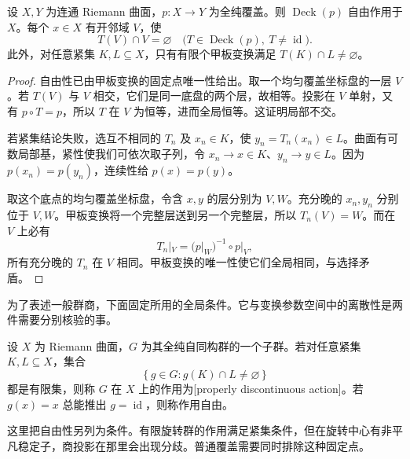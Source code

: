 \begin{proposition}[甲板作用的局部离散性]\label{b3:prop:11-deck-proper}
设 \(X,Y\) 为连通 Riemann 曲面，\(p:X\rightarrow Y\) 为全纯覆盖。则 \(\operatorname{Deck}(p)\) 自由作用于 \(X\)。每个 \(x\in X\) 有开邻域 \(V\)，使
\[
 T(V)\cap V=\varnothing\quad
 \bigl(T\in\operatorname{Deck}(p),\ T\ne\operatorname{id}\bigr).
\]
此外，对任意紧集 \(K,L\subseteq X\)，只有有限个甲板变换满足 \(T(K)\cap L\ne\varnothing\)。
\end{proposition}
\begin{proof}
自由性已由甲板变换的固定点唯一性给出。取一个均匀覆盖坐标盘的一层 \(V\)。若 \(T(V)\) 与 \(V\) 相交，它们是同一底盘的两个层，故相等。投影在 \(V\) 单射，又有 \(p\circ T=p\)，所以 \(T\) 在 \(V\) 为恒等，进而全局恒等。这证明局部不交。

若紧集结论失败，选互不相同的 \(T_n\) 及 \(x_n\in K\)，使 \(y_n=T_n(x_n)\in L\)。曲面有可数局部基，紧性使我们可依次取子列，令 \(x_n\rightarrow x\in K\)、\(y_n\rightarrow y\in L\)。因为 \(p(x_n)=p(y_n)\)，连续性给 \(p(x)=p(y)\)。

取这个底点的均匀覆盖坐标盘，令含 \(x,y\) 的层分别为 \(V,W\)。充分晚的 \(x_n,y_n\) 分别位于 \(V,W\)。甲板变换将一个完整层送到另一个完整层，所以 \(T_n(V)=W\)。而在 \(V\) 上必有
\[
 T_n|_V=(p|_W)^{-1}\circ p|_V,
\]
所有充分晚的 \(T_n\) 在 \(V\) 相同。甲板变换的唯一性使它们全局相同，与选择矛盾。
\end{proof}

为了表述一般群商，下面固定所用的全局条件。它与变换参数空间中的离散性是两件需要分别核验的事。

\begin{definition}\label{b3:def:11-proper-action}
设 \(X\) 为 Riemann 曲面，\(G\) 为其全纯自同构群的一个子群。若对任意紧集 \(K,L\subseteq X\)，集合
\[
 \{\,g\in G:g(K)\cap L\ne\varnothing\,\}
\]
都是有限集，则称 \(G\) 在 \(X\) 上的作用为[properly discontinuous action]。若 \(g(x)=x\) 总能推出 \(g=\operatorname{id}\)，则称作用自由。
\end{definition}

这里把自由性另列为条件。有限旋转群的作用满足紧集条件，但在旋转中心有非平凡稳定子，商投影在那里会出现分歧。普通覆盖需要同时排除这种固定点。


